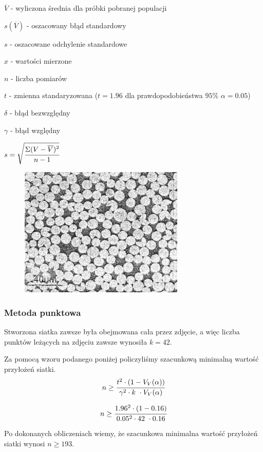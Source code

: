 \documentclass[a4paper,12pt]{article}
\begin{document}
$\overline{V}$ - wyliczona średnia dla próbki pobranej populacji

$s(\overline{V})$ - oszacowany błąd standardowy

$s$ - oszacowane odchylenie standardowe

$x$ - wartości mierzone 

$n$ - liczba pomiarów

$t$ - zmienna standaryzowana ($t=1.96$ dla prawdopodobieństwa $95\%$ $\alpha=0.05$)

$\delta$ - błąd bezwzględny

$\gamma$ - błąd względny

$s=\sqrt{\cfrac{\Sigma (V-\overline{V})^2}{n-1}}$

\begin{figure}[H]
    \centering
    \includegraphics[width=0.7\textwidth]{img/VV.png}
\end{figure}

\newpage

\subsubsection{Metoda punktowa}

{\color{purple}
Stworzona siatka zawsze była obejmowana cała przez zdjęcie, a więc liczba punktów leżących na zdjęciu zawsze wynosiła $k=42$. }

{\color{blue} Za pomocą wzoru podanego poniżej policzyliśmy szacunkową minimalną wartość przyłożeń siatki.
$$n\ge \cfrac{t^2 \cdot (1-V_V(\alpha))}{\gamma^2 \cdot k~\cdot V_V(\alpha)}$$

$$n\ge \cfrac{1.96^2 \cdot (1-0.16)}{0.05^2 \cdot 42~\cdot 0.16}$$
}

Po dokonanych obliczeniach wiemy, że szacunkowa minimalna wartość przyłożeń siatki wynosi $n\ge 193$.
\end{document}
